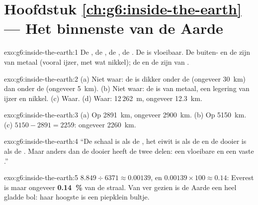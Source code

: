 \section*{Hoofdstuk \ref{ch:g6:inside-the-earth} --- Het binnenste van de Aarde}

\begin{solution}{exo:g6:inside-the-earth:1}
De , de , de , de . De  is
vloeibaar. De buiten- en de  zijn van metaal (vooral ijzer, met
wat nikkel); de  en de  zijn van .
\end{solution}

\begin{solution}{exo:g6:inside-the-earth:2}
(a) Niet waar: de  is dikker onder de  (ongeveer
30~km) dan onder de  (ongeveer 5~km). (b) Niet waar: de  is van
metaal, een legering van ijzer en nikkel. (c) Waar. (d) Waar: 12\,262~m,
ongeveer 12.3~km.
\end{solution}

\begin{solution}{exo:g6:inside-the-earth:3}
(a) Op 2891~km, ongeveer 2900~km. (b) Op 5150~km. (c) $5150 - 2891 = 2259$:
ongeveer 2260~km.
\end{solution}

\begin{solution}{exo:g6:inside-the-earth:4}
``De schaal is als de \underline{}, het eiwit is als de
\underline{} en de dooier is als de \underline{}. Maar anders dan
de dooier heeft de \underline{} twee delen: een vloeibare
\underline{} en een vaste \underline{}.''
\end{solution}

\begin{solution}{exo:g6:inside-the-earth:5}
$8.849 \div 6371 \approx 0.00139$, en $0.00139 \times 100 \approx 0.14$:
Everest is maar ongeveer \textbf{0.14~\%} van de straal. Van ver gezien is
de Aarde een heel gladde bol: haar hoogste  is een piepklein bultje.
\end{solution}

